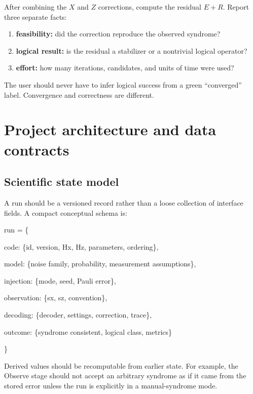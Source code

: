 \documentclass[11pt,letterpaper]{article}
\begin{document}
After combining the $X$ and $Z$ corrections, compute the residual $E+R$. Report three separate
facts:

\begin{enumerate}
  \item \textbf{feasibility:} did the correction reproduce the observed syndrome?
  \item \textbf{logical result:} is the residual a stabilizer or a nontrivial logical operator?
  \item \textbf{effort:} how many iterations, candidates, and units of time were used?
\end{enumerate}

The user should never have to infer logical success from a green ``converged'' label. Convergence
and correctness are different.

\section{Project architecture and data contracts}

\subsection{Scientific state model}

A run should be a versioned record rather than a loose collection of interface fields. A compact
conceptual schema is:

\begin{tcolorbox}[colback=paper,colframe=line,fontupper=\small\ttfamily]
run = \{\par
\quad code: \{id, version, Hx, Hz, parameters, ordering\},\par
\quad model: \{noise family, probability, measurement assumptions\},\par
\quad injection: \{mode, seed, Pauli error\},\par
\quad observation: \{sx, sz, convention\},\par
\quad decoding: \{decoder, settings, correction, trace\},\par
\quad outcome: \{syndrome consistent, logical class, metrics\}\par
\}
\end{tcolorbox}

Derived values should be recomputable from earlier state. For example, the Observe stage should not
accept an arbitrary syndrome as if it came from the stored error unless the run is explicitly in a
manual-syndrome mode.
\end{document}
